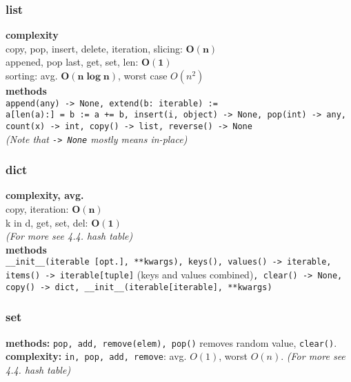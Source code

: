 \documentclass[]{article}
\newcommand\logn  {\log n}
\begin{document}
\begin{multicols}{2}
		\subsubsection{list}
		\textbf{complexity} \\
		copy, pop, insert, delete, iteration, slicing: $ \bm{O(n)} $ \\
		appened, pop last, get, set, len: $ \bm{O(1)} $ \\
		sorting: avg. $ \bm{O(n \logn)} $, worst case $ O(n^2) $ \\
		\textbf{methods} \\
		\texttt{append(any) -> None, extend(b: iterable) := \\ a[len(a):] = b := a += b, insert(i, object) -> None, pop(int) -> any, count(x) -> int, copy() -> list, reverse() -> None} \\
		\textit{(Note that \texttt{-> None} mostly means in-place)} 
		\subsubsection{dict}
		\textbf{complexity, avg. } \\
		copy, iteration: $ \bm{O(n)} $ \\
		k in d, get, set, del: $ \bm{O(1)} $ \\
		\textit{(For more see 4.4. hash table)} \\
		\textbf{methods} \\
		\texttt{\_\_init\_\_(iterable [opt.], **kwargs), keys(), values() -> iterable, items() -> iterable[tuple]} (keys and values combined)\texttt{, clear() -> None, copy() -> dict, \_\_init\_\_(iterable[iterable], **kwargs)}
		\subsubsection{set}
		\textbf{methods: }\texttt{pop, add, remove(elem), pop()} removes random value, \texttt{clear()}. \\
		\textbf{complexity: }\texttt{in, pop, add, remove}: avg. $ O(1) $, worst $ O(n) $. \textit{(For more see 4.4. hash table)}
		

\end{multicols}
\end{document}
